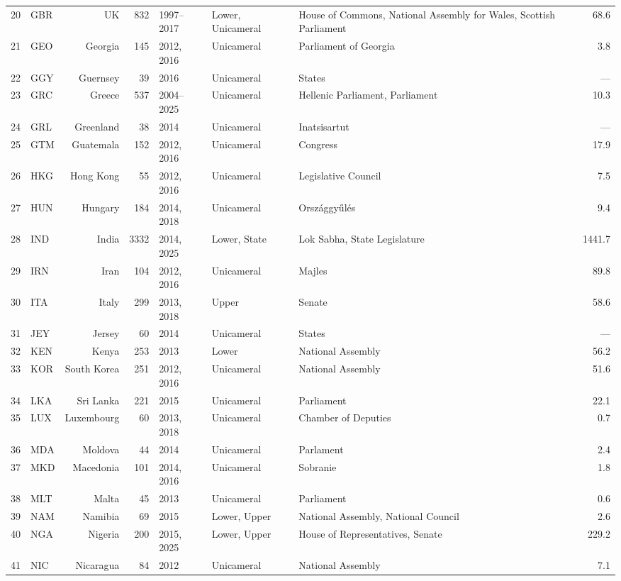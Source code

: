 \begin{table}[!htbp]
\begin{adjustbox}{max width=\linewidth}
\begin{tabular}{llrrlllr}
20 & GBR & UK & 832 & 1997--2017 & Lower, Unicameral & House of Commons, National Assembly for Wales, Scottish Parliament & 68.6 \\
21 & GEO & Georgia & 145 & 2012, 2016 & Unicameral & Parliament of Georgia & 3.8 \\
22 & GGY & Guernsey & 39 & 2016 & Unicameral & States & --- \\
23 & GRC & Greece & 537 & 2004--2025 & Unicameral & Hellenic Parliament, Parliament & 10.3 \\
24 & GRL & Greenland & 38 & 2014 & Unicameral & Inatsisartut & --- \\
25 & GTM & Guatemala & 152 & 2012, 2016 & Unicameral & Congress & 17.9 \\
26 & HKG & Hong Kong & 55 & 2012, 2016 & Unicameral & Legislative Council & 7.5 \\
27 & HUN & Hungary & 184 & 2014, 2018 & Unicameral & Országgyűlés & 9.4 \\
28 & IND & India & 3332 & 2014, 2025 & Lower, State & Lok Sabha, State Legislature & 1441.7 \\
29 & IRN & Iran & 104 & 2012, 2016 & Unicameral & Majles & 89.8 \\
30 & ITA & Italy & 299 & 2013, 2018 & Upper & Senate & 58.6 \\
31 & JEY & Jersey & 60 & 2014 & Unicameral & States & --- \\
32 & KEN & Kenya & 253 & 2013 & Lower & National Assembly & 56.2 \\
33 & KOR & South Korea & 251 & 2012, 2016 & Unicameral & National Assembly & 51.6 \\
34 & LKA & Sri Lanka & 221 & 2015 & Unicameral & Parliament & 22.1 \\
35 & LUX & Luxembourg & 60 & 2013, 2018 & Unicameral & Chamber of Deputies & 0.7 \\
36 & MDA & Moldova & 44 & 2014 & Unicameral & Parlament & 2.4 \\
37 & MKD & Macedonia & 101 & 2014, 2016 & Unicameral & Sobranie & 1.8 \\
38 & MLT & Malta & 45 & 2013 & Unicameral & Parliament & 0.6 \\
39 & NAM & Namibia & 69 & 2015 & Lower, Upper & National Assembly, National Council & 2.6 \\
40 & NGA & Nigeria & 200 & 2015, 2025 & Lower, Upper & House of Representatives, Senate & 229.2 \\
41 & NIC & Nicaragua & 84 & 2012 & Unicameral & National Assembly & 7.1 \\

\end{tabular}
\end{adjustbox}
\end{table}

